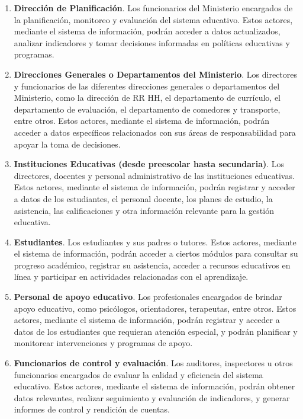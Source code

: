 \documentclass[9pt,a4paper]{IEEEtran}
\begin{document}
\begin{enumerate}
	\item \textbf{Direcci\'on de Planificaci\'on}. Los funcionarios del Ministerio encargados de la planificaci\'on, monitoreo y evaluaci\'on del sistema educativo. Estos actores, mediante el sistema de informaci\'on, podr\'an acceder a datos actualizados, analizar indicadores y tomar decisiones informadas en pol\'iticas educativas y programas.

	\item \textbf{Direcciones Generales o Departamentos del Ministerio}. Los directores y funcionarios de las diferentes direcciones generales o departamentos del Ministerio, como la direcci\'on de RR HH, el departamento de curr\'iculo, el departamento de evaluaci\'on, el departamento de comedores y transporte, entre otros. Estos actores, mediante el sistema de informaci\'on, podr\'an acceder a datos espec\'ificos relacionados con sus \'areas de responsabilidad para apoyar la toma de decisiones.

	\item \textbf{Instituciones Educativas (desde preescolar hasta secundaria)}. Los directores, docentes y personal administrativo de las instituciones educativas. Estos actores, mediante el sistema de informaci\'on, podr\'an registrar y acceder a datos de los estudiantes, el personal docente, los planes de estudio, la asistencia, las calificaciones y otra informaci\'on relevante para la gesti\'on educativa.

	\item \textbf{Estudiantes}. Los estudiantes y sus padres o tutores. Estos actores, mediante el sistema de informaci\'on, podr\'an acceder a ciertos m\'odulos para consultar su progreso acad\'emico, registrar su asistencia, acceder a recursos educativos en l\'inea y participar en actividades relacionadas con el aprendizaje.

	\item \textbf{Personal de apoyo educativo}. Los profesionales encargados de brindar apoyo educativo, como psic\'ologos, orientadores, terapeutas, entre otros. Estos actores, mediante el sistema de informaci\'on, podr\'an registrar y acceder a datos de los estudiantes que requieran atenci\'on especial, y podr\'an planificar y monitorear intervenciones y programas de apoyo.

	\item \textbf{Funcionarios de control y evaluaci\'on}. Los auditores, inspectores u otros funcionarios encargados de evaluar la calidad y eficiencia del sistema educativo. Estos actores, mediante el sistema de informaci\'on, podr\'an obtener datos relevantes, realizar seguimiento y evaluaci\'on de indicadores, y generar informes de control y rendici\'on de cuentas.


\end{enumerate}
\end{document}
